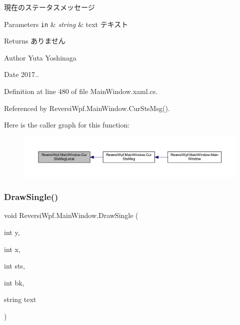 現在のステータスメッセージ 


\begin{DoxyParams}[1]{Parameters}
\mbox{\tt in}  & {\em string} & text テキスト \\
\hline
\end{DoxyParams}
\begin{DoxyReturn}{Returns}
ありません 
\end{DoxyReturn}
\begin{DoxyAuthor}{Author}
Yuta Yoshinaga 
\end{DoxyAuthor}
\begin{DoxyDate}{Date}
2017.. 
\end{DoxyDate}


Definition at line 480 of file Main\+Window.\+xaml.\+cs.



Referenced by Reversi\+Wpf.\+Main\+Window.\+Cur\+Sts\+Msg().

Here is the caller graph for this function\+:\nopagebreak
\begin{figure}[H]
\begin{center}
\leavevmode
\includegraphics[width=350pt]{class_reversi_wpf_1_1_main_window_a73402ffecf2de584339327dce357bd60_icgraph}
\end{center}
\end{figure}
\mbox{\label{class_reversi_wpf_1_1_main_window_aa7f29f9037ca59f0b41d4b383875bb5e}} 
\subsubsection{\texorpdfstring{Draw\+Single()}{DrawSingle()}}
{\footnotesize\ttfamily void Reversi\+Wpf.\+Main\+Window.\+Draw\+Single (\begin{DoxyParamCaption}\item[{int}]{y,  }\item[{int}]{x,  }\item[{int}]{sts,  }\item[{int}]{bk,  }\item[{string}]{text }\end{DoxyParamCaption})}



